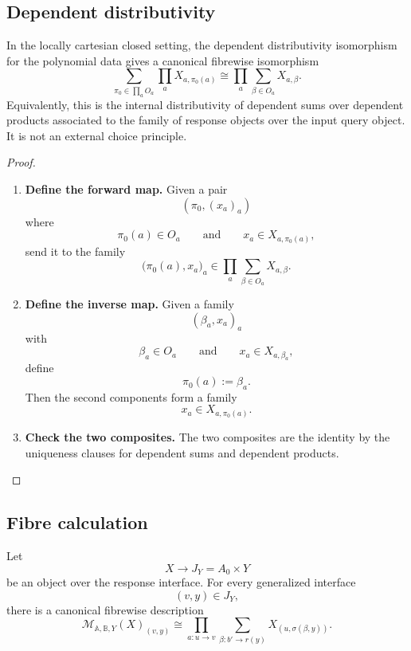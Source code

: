 \subsection{Dependent distributivity}
\label{subsec:poly-relative-dependent-distributivity}

\begin{lemma}
\label{lem:poly-relative-dependent-distributivity}
In the locally cartesian closed setting, the dependent distributivity
isomorphism for the polynomial data gives a canonical fibrewise isomorphism
\[
\sum_{\pi_0\in\prod_a O_a}
\prod_a X_{a,\pi_0(a)}
\cong
\prod_a
\sum_{\beta\in O_a}X_{a,\beta}.
\]
Equivalently, this is the internal distributivity of dependent sums over
dependent products associated to the family of response objects over the input
query object.  It is not an external choice principle.
\end{lemma}

\begin{proof}
\leavevmode
\begin{enumerate}
\item \textbf{Define the forward map.}
Given a pair
\[
(\pi_0,(x_a)_a)
\]
where
\[
\pi_0(a)\in O_a
\qquad\text{and}\qquad
x_a\in X_{a,\pi_0(a)},
\]
send it to the family
\[
\bigl(\pi_0(a),x_a\bigr)_a
\in
\prod_a\sum_{\beta\in O_a}X_{a,\beta}.
\]

\item \textbf{Define the inverse map.}
Given a family
\[
(\beta_a,x_a)_a
\]
with
\[
\beta_a\in O_a
\qquad\text{and}\qquad
x_a\in X_{a,\beta_a},
\]
define
\[
\pi_0(a):=\beta_a.
\]
Then the second components form a family
\[
x_a\in X_{a,\pi_0(a)}.
\]

\item \textbf{Check the two composites.}
The two composites are the identity by the uniqueness clauses for dependent
sums and dependent products.
\end{enumerate}
\end{proof}

\subsection{Fibre calculation}
\label{subsec:poly-relative-fibre-calculation}

\begin{proposition}
\label{prop:poly-relative-fibre-calculation}
Let
\[
X\to J_Y=A_0\times Y
\]
be an object over the response interface.  For every generalized interface
\[
(v,y)\in J_Y,
\]
there is a canonical fibrewise description
\[
\mathcal M_{\mathbb A,\mathbb B,Y}(X)_{(v,y)}
\cong
\prod_{a:u\to v}
\sum_{\beta:b'\to r(y)}
X_{(u,\sigma(\beta,y))}.
\]
\end{proposition}

